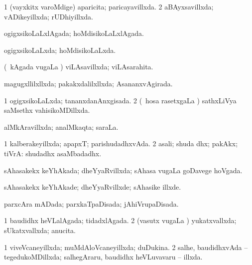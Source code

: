 {\bentry
{} 
\gl{\gu}
\expl{}
\bmng
\bnum
\num{1} (vayxkitx \mo varoMdige) aparicita; paricayavillxda. 
\num{2} aBAyxsavillxda; vADikeyillxda; rUDhiyillxda. 
\enum
\emng
\eentry

\bentry
{} 
\gl{\gu}
\expl{}
\bmng
ogigxsikoLaLxlAgada; hoMdisikoLaLxlAgada. 
\emng
\eentry

\bentry
{} 
\gl{\gu}
\expl{}
\bmng
ogigxsikoLaLxda; hoMdisikoLaLxda. 
\emng
\eentry

\bentry
{} 
\gl{\gu}
\expl{}
\bmng
(\kanmu\ kAgada \mo vugaLa \vi) viLAsavillxda; viLAsarahita. 
\emng
\eentry

\bentry
{} 
\gl{\gu}
\expl{}
\bmng
magugxllilxllxda; pakakxdalilxllxda; AsananxvAgirada. 
\emng
\eentry

\bentry
{} 
\gl{\gu}
\expl{}
\bmng
\bnum
\num{1} ogigxsikoLaLxda; tananxdanAnxgisada. 
\num{2} (\kanmu\ hosa rasetxgaLa \vi) sathxLiVya saMsethx vahisikoMDillxda. 
\enum
\emng
\eentry

\bentry
{} 
\gl{\gu}
\expl{}
\bmng
alMkAravillxda; analMkaqta; saraLa. 
\emng
\eentry

\bentry
{} 
\gl{\gu}
\expl{}
\bmng
\bnum
\num{1} kalberakeyillxda; apapxT; parishudadhxvAda. 
\num{2} asali; shuda dhx; pakAkx; tiVrA:  shudadhx asaMbadadhx. 
\enum
\emng
\eentry

\bentry
{} 
\gl{\gu}
\expl{}
\bmng
sAhasakekx keYhAkada; dheYyaRvillxda; sAhasa \mo vugaLa goDavege hoVgada. 
\emng
\eentry

\bentry
{} 
\gl{\kirxvi}
\expl{}
\bmng
sAhasakekx keYhAkade; dheYyaRvillxde; sAhasike illxde. 
\emng
\eentry

\bentry
{} 
\gl{\gu}
\expl{}
\bmng
parxcAra mADada; parxkaTpaDisada; jAhiVrupaDisada. 
\emng
\eentry

\bentry
{} 
\gl{\gu}
\expl{}
\bmng
\bnum
\num{1} baudidhx heVLalAgada; tidadxlAgada. 
\num{2} (vasutx \mo vugaLa \vi) yukatxvallxda; sUkatxvallxda; anucita. 
\enum
\emng
\eentry

\bentry
{} 
\gl{\gu}
\expl{}
\bmng
\bnum
\num{1} viveVcaneyillxda; muMdAloVcaneyillxda; duDukina. 
\num{2} salhe, baudidhxvAda -- tegedukoMDillxda; salhegAraru, baudidhx heVLuvavaru -- illxda. 
\enum
\emng
\eentry

}
